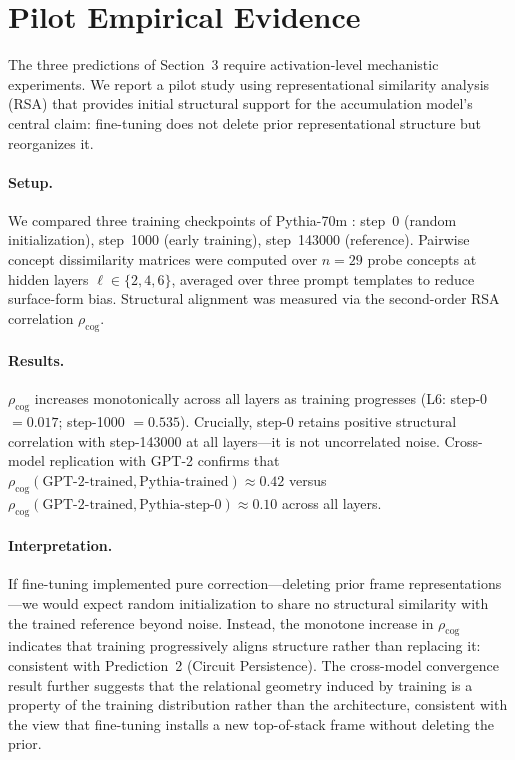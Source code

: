 \documentclass[12pt]{article}
\begin{document}
\section{Pilot Empirical Evidence}
\label{sec:pilot}

The three predictions of Section~3 require activation-level
mechanistic experiments. We report a pilot study using
representational similarity analysis (RSA) that provides
initial structural support for the accumulation model's
central claim: fine-tuning does not delete prior representational
structure but reorganizes it.

\paragraph{Setup.}
We compared three training checkpoints of Pythia-70m
\cite{biderman2023}: step~0 (random initialization),
step~1000 (early training), step~143000 (reference).
Pairwise concept dissimilarity matrices were computed over
$n = 29$ probe concepts at hidden layers $\ell \in \{2, 4, 6\}$,
averaged over three prompt templates to reduce surface-form bias.
Structural alignment was measured via the second-order RSA
correlation $\rho_\mathrm{cog}$.

\paragraph{Results.}
$\rho_\mathrm{cog}$ increases monotonically across all layers
as training progresses
(L6: step-0 $= 0.017$; step-1000 $= 0.535$).
Crucially, step-0 retains positive structural correlation
with step-143000 at all layers---it is not uncorrelated noise.
Cross-model replication with GPT-2 \cite{radford2019language}
confirms that $\rho_\mathrm{cog}(\text{GPT-2-trained},
\text{Pythia-trained}) \approx 0.42$ versus
$\rho_\mathrm{cog}(\text{GPT-2-trained},
\text{Pythia-step-0}) \approx 0.10$ across all layers.

\paragraph{Interpretation.}
If fine-tuning implemented pure correction---deleting prior
frame representations---we would expect random initialization
to share no structural similarity with the trained reference
beyond noise.
Instead, the monotone increase in $\rho_\mathrm{cog}$ indicates
that training progressively aligns structure rather than
replacing it: consistent with Prediction~2 (Circuit Persistence).
The cross-model convergence result further suggests that the
relational geometry induced by training is a property of the
training distribution rather than the architecture, consistent
with the view that fine-tuning installs a new top-of-stack
frame without deleting the prior.
\end{document}
